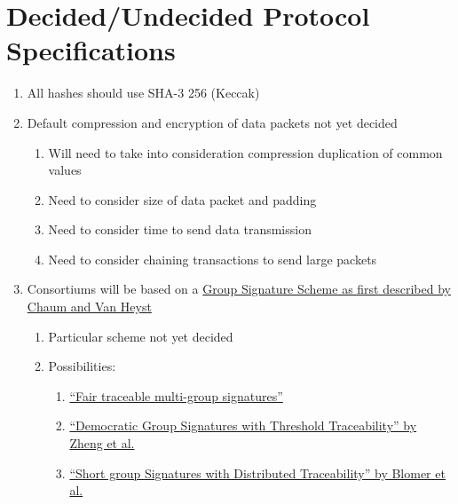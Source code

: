 \documentclass[12pt]{article}
\begin{document}
\section{Decided/Undecided Protocol Specifications}
\begin{enumerate}
	\item{All hashes should use SHA-3 256 (Keccak)}
	\item{Default compression and encryption of data packets not yet decided}
		\begin{enumerate}
			\item{Will need to take into consideration compression duplication of common values}
			\item{Need to consider size of data packet and padding}
			\item{Need to consider time to send data transmission}
			\item{Need to consider chaining transactions to send large packets}
		\end{enumerate}
	\item{Consortiums will be based on a 
			\href{https://dl.acm.org/citation.cfm?id=1754897}{Group Signature Scheme as first described by Chaum and Van Heyst}
		}
		\begin{enumerate}
			\item{Particular scheme not yet decided}
			\item{Possibilities:}
				\begin{enumerate}
					\item{\href{https://eprint.iacr.org/2008/047.pdf}{“Fair traceable multi-group signatures”}}
					\item{\href{https://eprint.iacr.org/2008/112.pdf}{“Democratic Group Signatures with Threshold Traceability” by Zheng et al.}}
					\item{\href{https://pdfs.semanticscholar.org/dfd3/0ee27ab7167900dbdddff11b22132f9ea5d5.pdf}{“Short group Signatures with Distributed Traceability” by Blomer et al.}}
				\end{enumerate}
		\end{enumerate}
\end{enumerate}
\end{document}

